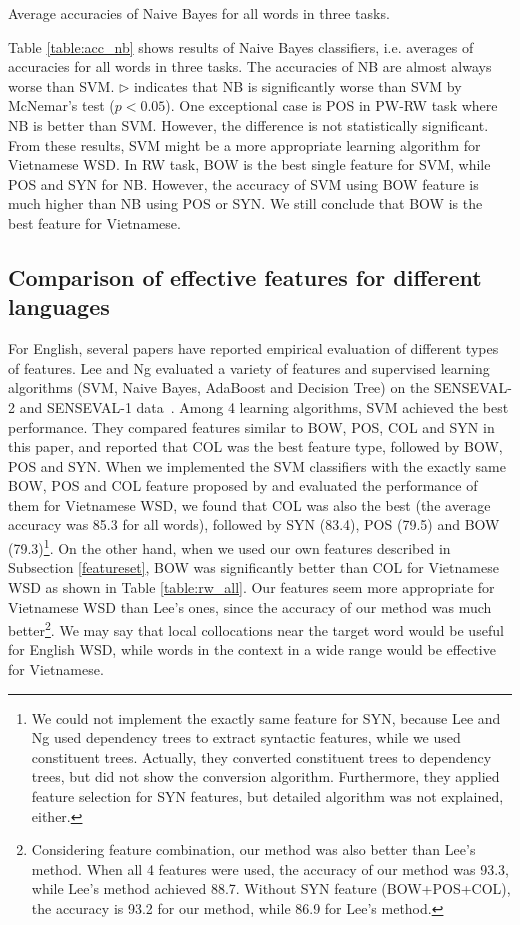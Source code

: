 \documentclass[english]{jnlp_1.4}
\begin{document}
\begin{table}[t]
\caption{Average accuracies of Naive Bayes for all words in three tasks.}
\label{table:acc_nb}

\end{table}

Table \ref{table:acc_nb} shows results of Naive Bayes classifiers,
i.e. averages of accuracies for all words in three tasks.
The accuracies of NB are almost always worse than SVM. 
$\triangleright$ indicates that NB is significantly worse than SVM by McNemar's test ($p<0.05$). 
One exceptional case is POS in PW-RW task where NB is better than SVM. 
However, the difference is not statistically significant. 
From these results, 
SVM might be a more appropriate learning algorithm for Vietnamese WSD.
In RW task,
BOW is the best single feature for SVM,
while POS and SYN for NB.
However,
the accuracy of SVM using BOW feature is much higher than NB using POS or SYN.
We still conclude that BOW is the best feature for Vietnamese.

\subsection{Comparison of effective features for different languages} \label{Otherlanguage}
For English, several papers have reported empirical evaluation of
different types of features.
Lee and Ng evaluated a variety of features and supervised
learning algorithms (SVM, Naive Bayes, AdaBoost and Decision Tree)
on the SENSEVAL-2 and SENSEVAL-1 data~\cite{lee:02:a}.
Among 4 learning algorithms, SVM achieved the best performance.
They compared features similar to BOW, POS, COL and SYN in this paper,
and reported that COL was the best feature type,
followed by BOW, POS and SYN.
When we implemented the SVM classifiers with the exactly same BOW, POS and COL
feature proposed by \cite{lee:02:a} and evaluated the performance of them for Vietnamese WSD,
we found that COL was also the best 
(the average accuracy was 85.3 for all words),
followed by SYN (83.4), POS (79.5) and BOW (79.3)\footnote{We could not
implement the exactly same feature for SYN, because Lee and Ng used dependency trees to extract syntactic features,
while we used constituent trees.
Actually, they converted constituent trees to dependency trees, 
but did not show the conversion algorithm.
Furthermore, they applied feature selection for SYN features,
but detailed algorithm was not explained, either.}.
On the other hand,
when we used our own features described in Subsection \ref{featureset},
BOW was significantly better than COL for Vietnamese WSD
as shown in Table \ref{table:rw_all}.
Our features seem more appropriate for Vietnamese WSD than Lee's ones,
since the accuracy of our method was much better\footnote{Considering feature combination,
our method was also better than Lee's method.
When all 4 features were used, 
the accuracy of our method was 93.3,
while Lee's method achieved 88.7. 
Without SYN feature (BOW+POS+COL), the accuracy is 93.2 for our method,
while 86.9 for Lee's method.}.
We may say that
local collocations near the target word would be useful for English WSD,
while words in the context in a wide range would be effective
for Vietnamese.
\end{document}
